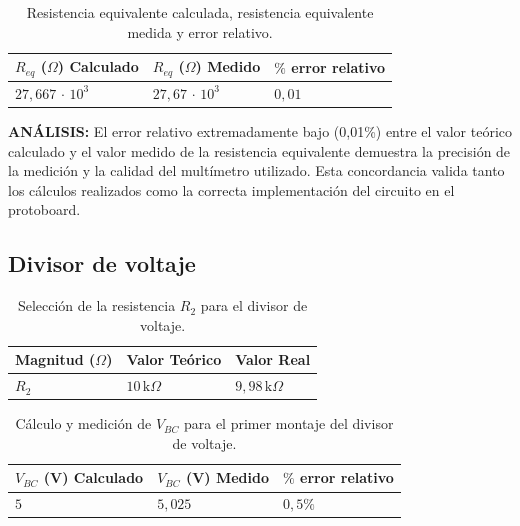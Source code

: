 \documentclass[12pt,a4paper]{article}
\begin{document}
\begin{table}[H]
    \centering
    \fontsize{10pt}{12pt}\selectfont
    \renewcommand{\arraystretch}{1.2}
    \setlength{\tabcolsep}{6pt}
    {
    \begin{tabular}{|C{4.0cm}|C{4.0cm}|C{4.0cm}|}
    \hline
    \textbf{$R_{eq}$ ($\Omega$) Calculado} &
    \textbf{$R_{eq}$ ($\Omega$) Medido} &
    \textbf{$\%$ error relativo} \\
    \hline
    $27,667\,\cdot\,10^{3}$ & $27,67\,\cdot\,10^{3}$ & $0,01$ \\
    \hline
    \end{tabular}}
\caption{Resistencia equivalente calculada, resistencia equivalente medida y error relativo.}
\label{tab:red-resistiva-resultados}
\end{table}

\textbf{ANÁLISIS:} El error relativo extremadamente bajo (0,01\%) entre el valor teórico calculado y el valor medido de la resistencia equivalente demuestra la precisión de la medición y la calidad del multímetro utilizado. Esta concordancia valida tanto los cálculos realizados como la correcta implementación del circuito en el protoboard.

\bigskip
\subsection{Divisor de voltaje}

\begin{table}[H]
    \centering
    \fontsize{10pt}{12pt}\selectfont
    \renewcommand{\arraystretch}{1.2}
    \setlength{\tabcolsep}{6pt}
    {
    \begin{tabular}{|C{3cm}|C{3cm}|C{3cm}|}
    \hline
    \textbf{Magnitud ($\Omega$) } & \textbf{Valor Teórico} & \textbf{Valor Real}\\
    \hline
    $R_2$ & $10\,\mathrm{k}\Omega$ & $9,98\,\mathrm{k}\Omega$ \\
    \hline
    \end{tabular}}
\caption{Selección de la resistencia $R_2$ para el divisor de voltaje.}
\label{tab:divisor-voltaje-r2}
\end{table}

\begin{table}[H]
    \centering
    \fontsize{10pt}{12pt}\selectfont
    \renewcommand{\arraystretch}{1.2}
    \setlength{\tabcolsep}{6pt}
    {
    \begin{tabular}{|C{4cm}|C{4cm}|C{4cm}|}
    \hline
    \textbf{$V_{BC}$ (V) Calculado} & \textbf{$V_{BC}$ (V) Medido} & \textbf{$\%$ error relativo} \\
    \hline
    $5$ & $5{,}025$ & $0{,}5\%$ \\
    \hline
    \end{tabular}}
\caption{Cálculo y medición de $V_{BC}$ para el primer montaje del divisor de voltaje.}
\label{tab:divisor-voltaje-vbc-1}
\end{table}
\end{document}
